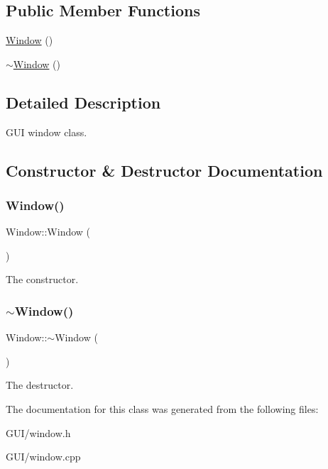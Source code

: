 \subsection*{Public Member Functions}
\begin{DoxyCompactItemize}
\item 
\hyperlink{classWindow_a74e6087da23d3c24e9fac0245e5ec92c}{Window} ()
\item 
\hyperlink{classWindow_a245d821e6016fa1f6970ccbbedd635f6}{$\sim$\+Window} ()
\end{DoxyCompactItemize}


\subsection{Detailed Description}
G\+UI window class. 

\subsection{Constructor \& Destructor Documentation}
\mbox{\label{classWindow_a74e6087da23d3c24e9fac0245e5ec92c}} 
\subsubsection{\texorpdfstring{Window()}{Window()}}
{\footnotesize\ttfamily Window\+::\+Window (\begin{DoxyParamCaption}{ }\end{DoxyParamCaption})}

The constructor. \mbox{\label{classWindow_a245d821e6016fa1f6970ccbbedd635f6}} 
\subsubsection{\texorpdfstring{$\sim$\+Window()}{~Window()}}
{\footnotesize\ttfamily Window\+::$\sim$\+Window (\begin{DoxyParamCaption}{ }\end{DoxyParamCaption})}

The destructor. 

The documentation for this class was generated from the following files\+:\begin{DoxyCompactItemize}
\item 
G\+U\+I/window.\+h\item 
G\+U\+I/window.\+cpp\end{DoxyCompactItemize}
